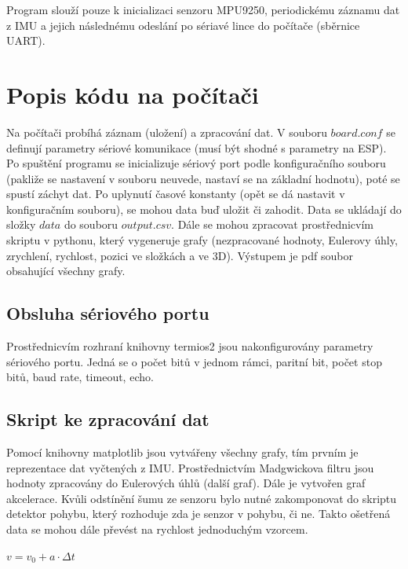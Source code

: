 \documentclass{article}
\begin{document}
\vspace{1em}

Program slouží pouze k inicializaci senzoru MPU9250, periodickému záznamu dat z IMU a jejich následnému odeslání po sériavé lince do počítače (sběrnice UART).

\newpage

\section{Popis kódu na počítači}

Na počítači probíhá záznam (uložení) a zpracování dat. V souboru $board.conf$  se definují parametry sériové komunikace (musí být shodné s parametry na ESP). Po spuštění programu se inicializuje sériový port podle konfiguračního souboru (pakliže se nastavení v souboru neuvede, nastaví se na základní hodnotu), poté se spustí záchyt dat. Po uplynutí časové konstanty (opět se dá nastavit v konfiguračním souboru), se mohou data buď uložit či zahodit. Data se ukládají do složky $data$ do souboru $output.csv$. Dále se mohou zpracovat prostřednicvím skriptu v pythonu, který vygeneruje grafy (nezpracované hodnoty, Eulerovy úhly, zrychlení, rychlost, pozici ve složkách a ve 3D). Výstupem je pdf soubor obsahující všechny grafy.

\subsection{Obsluha sériového portu}

Prostřednicvím rozhraní knihovny termios2 jsou nakonfigurovány parametry sériového portu. Jedná se o počet bitů v jednom rámci, paritní bit, počet stop bitů, baud rate, timeout, echo.

\subsection{Skript ke zpracování dat}

Pomocí knihovny matplotlib jsou vytvářeny všechny grafy, tím prvním je reprezentace dat vyčtených z IMU. 
Prostřednictvím Madgwickova filtru jsou hodnoty zpracovány do Eulerových úhlů (další graf). Dále je vytvořen graf akcelerace. Kvůli odstínění šumu ze senzoru bylo nutné zakomponovat do skriptu detektor pohybu, který rozhoduje zda je senzor v pohybu, či ne. Takto ošetřená data se mohou dále převést na rychlost jednoduchým vzorcem.

\begin{center}
    \begin{math}
        v = v_{0} + a \cdot \Delta t
    \end{math}
\end{center}
\end{document}
